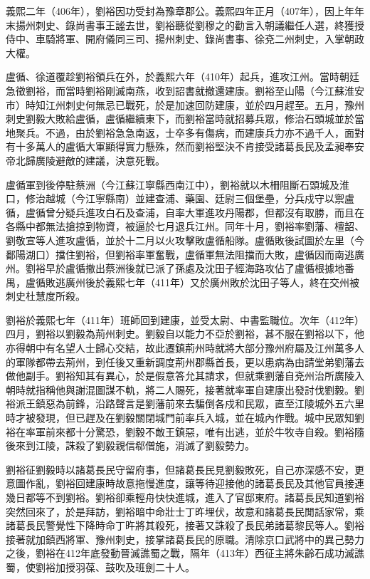 義熙二年（406年），劉裕因功受封為豫章郡公。義熙四年正月（407年），因上年年末揚州刺史、錄尚書事王謐去世，劉裕聽從劉穆之的勸言入朝議繼任人選，終獲授侍中、車騎將軍、開府儀同三司、揚州刺史、錄尚書事、徐兗二州刺史，入掌朝政大權。

盧循、徐道覆趁劉裕領兵在外，於義熙六年（410年）起兵，進攻江州。當時朝廷急徵劉裕，而當時劉裕剛滅南燕，收到詔書就撤還建康。劉裕至山陽（今江蘇淮安市）時知江州刺史何無忌已戰死，於是加速回防建康，並於四月趕至。五月，豫州刺史劉毅大敗給盧循，盧循繼續東下，而劉裕當時就招募兵眾，修治石頭城並於當地聚兵。不過，由於劉裕急急南返，士卒多有傷病，而建康兵力亦不過千人，面對有十多萬人的盧循大軍顯得實力懸殊，然而劉裕堅決不肯接受諸葛長民及孟昶奉安帝北歸廣陵避敵的建議，決意死戰。

盧循軍到後停駐蔡洲（今江蘇江寧縣西南江中），劉裕就以木柵阻斷石頭城及淮口，修治越城（今江寧縣南）並建查浦、藥園、廷尉三個堡壘，分兵戍守以禦盧循，盧循曾分疑兵進攻白石及查浦，自率大軍進攻丹陽郡，但都沒有取勝，而且在各縣中都無法搶掠到物資，被逼於七月退兵江州。同年十月，劉裕率劉藩、檀韶、劉敬宣等人進攻盧循，並於十二月以火攻擊敗盧循船隊。盧循敗後試圖於左里（今鄱陽湖口）擋住劉裕，但劉裕率軍奮戰，盧循軍無法阻擋而大敗，盧循因而南逃廣州。劉裕早於盧循撤出蔡洲後就已派了孫處及沈田子經海路攻佔了盧循根據地番禺，盧循敗逃廣州後於義熙七年（411年）又於廣州敗於沈田子等人，終在交州被刺史杜慧度所殺。

劉裕於義熙七年（411年）班師回到建康，並受太尉、中書監職位。次年（412年）四月，劉裕以劉毅為荊州刺史。劉毅自以能力不亞於劉裕，甚不服在劉裕以下，他亦得朝中有名望人士歸心交結，故此遷鎮荊州時就將大部分豫州府屬及江州萬多人的軍隊都帶去荊州，到任後又重新調度荊州郡縣首長，更以患病為由請堂弟劉藩去做他副手。劉裕知其有異心，於是假意答允其請求，但就乘劉藩自兗州治所廣陵入朝時就指稱他與謝混圖謀不軌，將二人賜死，接著就率軍自建康出發討伐劉毅。劉裕派王鎮惡為前鋒，沿路聲言是劉藩前來去騙倒各戍和民眾，直至江陵城外五六里時才被發現，但已趕及在劉毅關閉城門前率兵入城，並在城內作戰。城中民眾知劉裕在率軍前來都十分驚恐，劉毅不敵王鎮惡，唯有出逃，並於牛牧寺自殺。劉裕隨後來到江陵，誅殺了劉毅親信郗僧施，消滅了劉毅勢力。

劉裕征劉毅時以諸葛長民守留府事，但諸葛長民見劉毅敗死，自己亦深感不安，更意圖作亂，劉裕回建康時故意拖慢進度，讓等待迎接他的諸葛長民及其他官員接連幾日都等不到劉裕。劉裕卻乘輕舟快快進城，進入了官邸東府。諸葛長民知道劉裕突然回來了，於是拜訪，劉裕暗中命壯士丁旿埋伏，故意和諸葛長民閒話家常，乘諸葛長民警覺性下降時命丁旿將其殺死，接著又誅殺了長民弟諸葛黎民等人。劉裕接著就加鎮西將軍、豫州刺史，接掌諸葛長民的原職。清除京口武將中的異己勢力之後，劉裕在412年底發動晉滅譙蜀之戰，隔年（413年）西征主將朱齡石成功滅譙蜀，使劉裕加授羽葆、鼓吹及班劍二十人。

